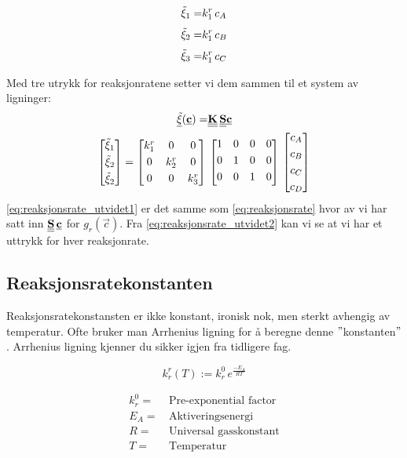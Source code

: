 \begin{align}
    \Tilde{\xi}_1 =& k^r_1\,c_A \\[0.3em]
    \Tilde{\xi}_2 =& k^r_1\,c_B \\[0.3em]
    \Tilde{\xi}_3 =& k^r_1\,c_C \\
\end{align}

Med tre utrykk for reaksjonratene setter vi dem sammen til et system av ligninger:
\begin{align}
    \label{eq:reaksjonsrate_utvidet1}
    \underline{\Tilde{\xi}}(\underline{\textbf{c}}) =& \underline{\underline{\textbf{K}}}\,\underline{\underline{\textbf{S}}}\underline{\textbf{c}}
    \\
    \label{eq:reaksjonsrate_utvidet2}
    \begin{bmatrix}
    \Tilde{\xi}_1 \\[0.3em]
    \Tilde{\xi}_2 \\[0.3em]
    \Tilde{\xi}_2
    \end{bmatrix}   
    =
    \begin{bmatrix}
    k^r_1 & 0 & 0 \\[0.3em]
    0 & k^r_2 & 0\\[0.3em]
    0 & 0 & k^r_3
    \end{bmatrix}
    \,&
   \begin{bmatrix}
   1 & 0 & 0 & 0\\[0.3em]
   0 & 1 & 0 & 0\\[0.3em]
   0 & 0 & 1 & 0\\[0.3em]
   \end{bmatrix}
   \,
   \begin{bmatrix}
   c_A\\[0.3em]
   c_B\\[0.3em]
   c_C\\[0.3em]
   c_D
   \end{bmatrix}
\end{align}
\cref{eq:reaksjonsrate_utvidet1} er det samme som \cref{eq:reaksjonsrate} hvor av vi har satt inn $\underline{\underline{\textbf{S}}}\,\underline{\textbf{c}}$ for $g_r(\vec{c})$. Fra \cref{eq:reaksjonsrate_utvidet2} kan vi se at vi har et uttrykk for hver reaksjonrate. 



\subsection{Reaksjonsratekonstanten}
Reaksjonsratekonstansten er ikke konstant, ironisk nok, men sterkt avhengig av temperatur. Ofte bruker man Arrhenius ligning for å beregne denne $"$konstanten$"$. Arrhenius ligning kjenner du sikker igjen fra tidligere fag.

\begin{equation}
    \label{eq:arrhenius}
    k^r_r(T) :=k^0_r\,e^{\frac{-E_{A}}{RT}}
\end{equation}

\begin{align*}
    k^0_r =&\, \text{Pre-exponential factor} \\
    E_A =&\, \text{Aktiveringsenergi} \\
    R =&\, \text{Universal gasskonstant} \\
    T =&\, \text{Temperatur}
\end{align*}


